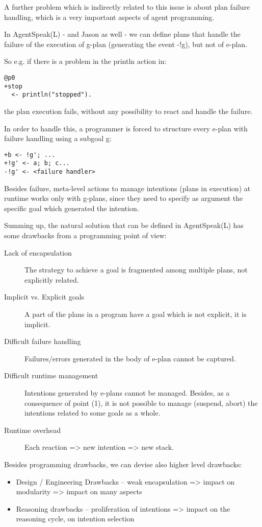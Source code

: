 A further problem which is indirectly related to this issue is about plan failure handling, which is a very important aspects of agent programming.

In AgentSpeak(L) - and Jason as well - we can define plans that handle the failure of the execution of g-plan (generating the event -!g), but not of e-plan.

So e.g. if there is a problem in the println action in:

\begin{verbatim}
@p0
+stop
  <- println("stopped").
\end{verbatim}

the plan execution fails, without any possibility to react and handle the failure.

In order to handle this, a programmer is forced to structure every e-plan with failure handling using a subgoal g:

\begin{verbatim}
+b <- !g'; ...
+!g' <- a; b; c...
-!g' <- <failure handler>
\end{verbatim}

Besides failure, meta-level actions to manage intentions (plans in execution) at runtime
works only with g-plans, since they need to specify as argument the specific goal which generated the intention.

\bigskip

Summing up, the natural solution that can be defined in AgentSpeak(L) has some drawbacks from a programming point of view:

\begin{description}
%
\item[Lack of encapsulation]  The strategy to achieve a goal is fragmented among multiple plans, not explicitly related.
%
\item[Implicit vs. Explicit goals]  A part of the plans in a program have a goal which is not explicit, it is implicit.
%
\item[Difficult failure handling] Failures/errors generated in the body of e-plan cannot be captured.
%
\item[Difficult runtime management] Intentions generated by e-plans cannot be managed. Besides, as a consequence of point (1), it is not possible to manage (suspend, abort) the intentions related to some goals as a whole.
%
\item[Runtime overhead] Each reaction => new intention => new stack. 
%
\end{description}

Besides programming drawbacks, we can devise also higher level drawbacks:

\begin{itemize}
%
\item Design / Engineering Drawbacks -- weak encapsulation => impact on modularity => impact on many aspects

%
\item Reasoning drawbacks -- proliferation of intentions => impact on the reasoning cycle, on intention selection
%
\end{itemize}


